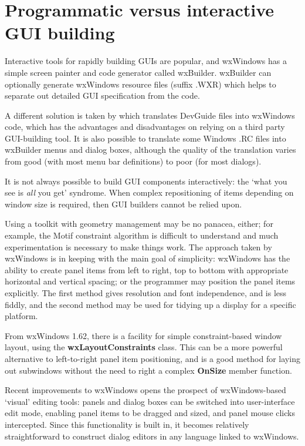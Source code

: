 \section{Programmatic versus interactive GUI building}

Interactive tools for rapidly building GUIs are popular, and
wxWindows has a simple screen painter and code generator called
wxBuilder. wxBuilder can optionally generate wxWindows resource
files (suffix .WXR) which helps to separate out detailed GUI specification
from the code.

A different solution is taken by  which
translates DevGuide files into wxWindows code, which has
the advantages and disadvantages on relying on a third party
GUI-building tool. It is also possible to translate some
Windows .RC files into wxBuilder menus and dialog boxes,
although the quality of the translation varies from good
(with most menu bar definitions) to poor (for most dialogs).

It is not always possible to build GUI components interactively: the
`what you see is {\it all} you get' syndrome. When complex repositioning
of items depending on window size is required, then GUI builders
cannot be relied upon.

Using a toolkit with geometry management may be no panacea, either; for
example, the Motif constraint algorithm is difficult to understand and
much experimentation is necessary to make things work. The approach
taken by wxWindows is in keeping with the main goal of simplicity:
wxWindows has the ability to create panel items from left to right, top
to bottom with appropriate horizontal and vertical spacing; or the
programmer may position the panel items explicitly. The first method
gives resolution and font independence, and is less fiddly, and the
second method may be used for tidying up a display for a specific
platform.

From wxWindows 1.62, there is a facility for simple constraint-based
window layout, using the {\bf wxLayoutConstraints} class. This can be
a more powerful alternative to left-to-right panel item positioning, and
is a good method for laying out subwindows without the need to right
a complex {\bf OnSize} member function.

Recent improvements to wxWindows opens the prospect of wxWindows-based
`visual' editing tools: panels and dialog boxes can be switched into user-interface edit
mode, enabling panel items to be dragged and sized, and panel mouse clicks
intercepted. Since this functionality is built in, it becomes relatively
straightforward to construct dialog editors in any language linked to
wxWindows.

